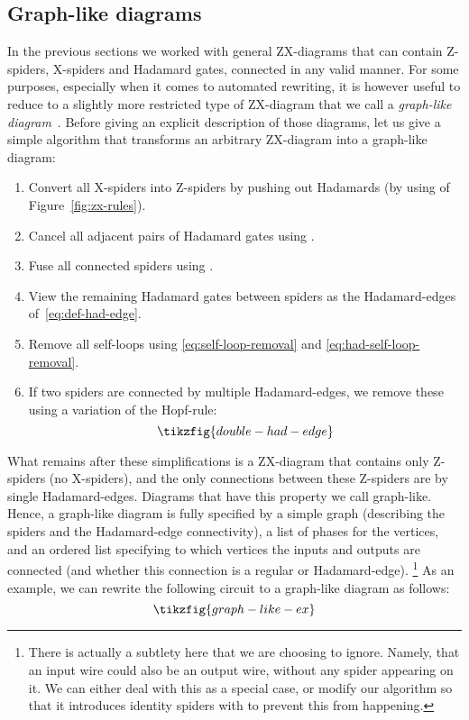 \documentclass[a4paper,onecolumn,superscriptaddress,11pt,%
				unpublished,%
				allowfontchageintitle,%
				]{quantumarticle}
\begin{document}
\subsection{Graph-like diagrams}\label{sec:graph-like}
In the previous sections we worked with general ZX-diagrams that can contain Z-spiders, X-spiders and Hadamard gates, connected in any valid manner.
For some purposes, especially when it comes to automated rewriting, it is however useful to reduce to a slightly more restricted type of ZX-diagram that we call a \emph{graph-like diagram}~\cite{cliffsimp}. Before giving an explicit description of those diagrams, let us give a simple algorithm that transforms an arbitrary ZX-diagram into a graph-like diagram:
\begin{enumerate}
	\item Convert all X-spiders into Z-spiders by pushing out Hadamards (by using \HadamardRule of Figure~\ref{fig:zx-rules}).
	\item Cancel all adjacent pairs of Hadamard gates using \HHRule.
	\item Fuse all connected spiders using \SpiderRule.
	\item View the remaining Hadamard gates between spiders as the Hadamard-edges of~\eqref{eq:def-had-edge}.
	\item Remove all self-loops using \eqref{eq:self-loop-removal} and \eqref{eq:had-self-loop-removal}.
	\item If two spiders are connected by multiple Hadamard-edges, we remove these using a variation of the Hopf-rule:
	\begin{equation}\label{eq:remove-double-edge}
		\tikzfig{double-had-edge}
	\end{equation}
\end{enumerate}

What remains after these simplifications is a ZX-diagram that contains only Z-spiders (no X-spiders), and the only connections between these Z-spiders are by single Hadamard-edges. Diagrams that have this property we call graph-like.
Hence, a graph-like diagram is fully specified by a simple graph (describing the spiders and the Hadamard-edge connectivity), a list of phases for the vertices, and an ordered list specifying to which vertices the inputs and outputs are connected (and whether this connection is a regular or Hadamard-edge).%
\footnote{There is actually a subtlety here that we are choosing to ignore. Namely, that an input wire could also be an output wire, without any spider appearing on it. We can either deal with this as a special case, or modify our algorithm so that it introduces identity spiders with \IdRule to prevent this from happening.}
As an example, we can rewrite the following circuit to a graph-like diagram as follows:
\begin{equation}\label{eq:graph-like-ex}
	\tikzfig{graph-like-ex}
\end{equation}
\end{document}

